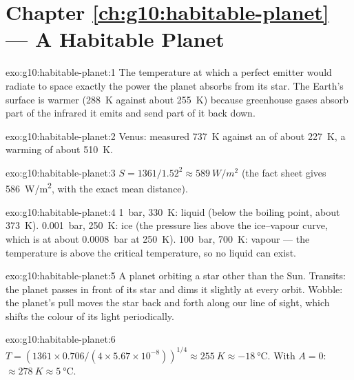 \section*{Chapter \ref{ch:g10:habitable-planet} --- A Habitable Planet}

\begin{solution}{exo:g10:habitable-planet:1}
The temperature at which a perfect emitter would radiate to space exactly the
power the planet absorbs from its star. The Earth's surface is warmer
(\qty{288}{K} against about \qty{255}{K}) because greenhouse gases absorb
part of the infrared it emits and send part of it back down.
\end{solution}

\begin{solution}{exo:g10:habitable-planet:2}
Venus: measured \qty{737}{K} against an  of about
\qty{227}{K}, a warming of about \qty{510}{K}.
\end{solution}

\begin{solution}{exo:g10:habitable-planet:3}
$S = 1361/1.52^2 \approx \qty{589}{W/m^2}$ (the fact sheet gives
\qty{586}{W/m^2}, with the exact mean distance).
\end{solution}

\begin{solution}{exo:g10:habitable-planet:4}
\qty{1}{bar}, \qty{330}{K}: liquid (below the boiling point, about
\qty{373}{K}). \qty{0.001}{bar}, \qty{250}{K}: ice (the pressure lies above
the ice--vapour curve, which is at about \qty{0.0008}{bar} at \qty{250}{K}).
\qty{100}{bar}, \qty{700}{K}: vapour --- the temperature is above the critical
temperature, so no liquid can exist.
\end{solution}

\begin{solution}{exo:g10:habitable-planet:5}
A planet orbiting a star other than the Sun. Transits: the planet passes in
front of its star and dims it slightly at every orbit. Wobble: the planet's
pull moves the star back and forth along our line of sight, which shifts the
colour of its light periodically.
\end{solution}

\begin{solution}{exo:g10:habitable-planet:6}
$T = (1361 \times 0.706/(4 \times 5.67\times10^{-8}))^{1/4} \approx
\qty{255}{K} \approx \qty{-18}{\degreeCelsius}$. With $A = 0$:
$\approx \qty{278}{K} \approx \qty{5}{\degreeCelsius}$.
\end{solution}

